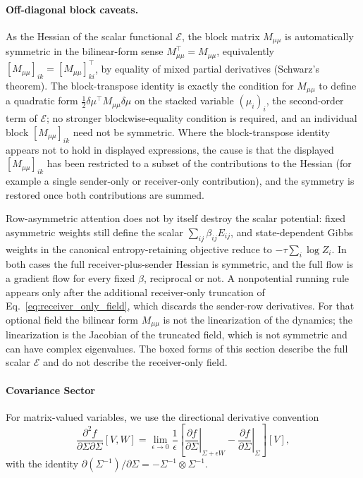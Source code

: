 \paragraph{Off-diagonal block caveats.}\label{sec:mass_block_caveats}
As the Hessian of the scalar functional $\mathcal{E}$, the block matrix $M_{\mu\mu}$ is automatically symmetric in the bilinear-form sense $M_{\mu\mu}^\top = M_{\mu\mu}$, equivalently $[M_{\mu\mu}]_{ik} = [M_{\mu\mu}]_{ki}^\top$, by equality of mixed partial derivatives (Schwarz's theorem). The block-transpose identity is exactly the condition for $M_{\mu\mu}$ to define a quadratic form $\tfrac12 \delta\mu^\top M_{\mu\mu} \delta\mu$ on the stacked variable $(\mu_i)_i$, the second-order term of $\mathcal{E}$; no stronger blockwise-equality condition is required, and an individual block $[M_{\mu\mu}]_{ik}$ need not be symmetric. Where the block-transpose identity appears not to hold in displayed expressions, the cause is that the displayed $[M_{\mu\mu}]_{ik}$ has been restricted to a subset of the contributions to the Hessian (for example a single sender-only or receiver-only contribution), and the symmetry is restored once both contributions are summed.

Row-asymmetric attention does not by itself destroy the scalar potential: fixed asymmetric weights still define the scalar $\sum_{ij}\beta_{ij}E_{ij}$, and state-dependent Gibbs weights in the canonical entropy-retaining objective reduce to $-\tau\sum_i\log Z_i$. In both cases the full receiver-plus-sender Hessian is symmetric, and the full flow is a gradient flow for every fixed $\beta$, reciprocal or not. A nonpotential running rule appears only after the additional receiver-only truncation of Eq.~\eqref{eq:receiver_only_field}, which discards the sender-row derivatives. For that optional field the bilinear form $M_{\mu\mu}$ is not the linearization of the dynamics; the linearization is the Jacobian of the truncated field, which is not symmetric and can have complex eigenvalues. The boxed forms of this section describe the full scalar $\mathcal{E}$ and do not describe the receiver-only field.

\paragraph{Covariance Sector}

For matrix-valued variables, we use the directional derivative convention
\begin{equation}
\frac{\partial^2 f}{\partial \Sigma \partial \Sigma}[V, W] = \lim_{\epsilon \to 0} \frac{1}{\epsilon}\left[\left.\frac{\partial f}{\partial \Sigma}\right|_{\Sigma + \epsilon W} - \left.\frac{\partial f}{\partial \Sigma}\right|_{\Sigma}\right][V],
\end{equation}
with the identity $\partial(\Sigma^{-1})/\partial \Sigma = -\Sigma^{-1} \otimes \Sigma^{-1}$.

